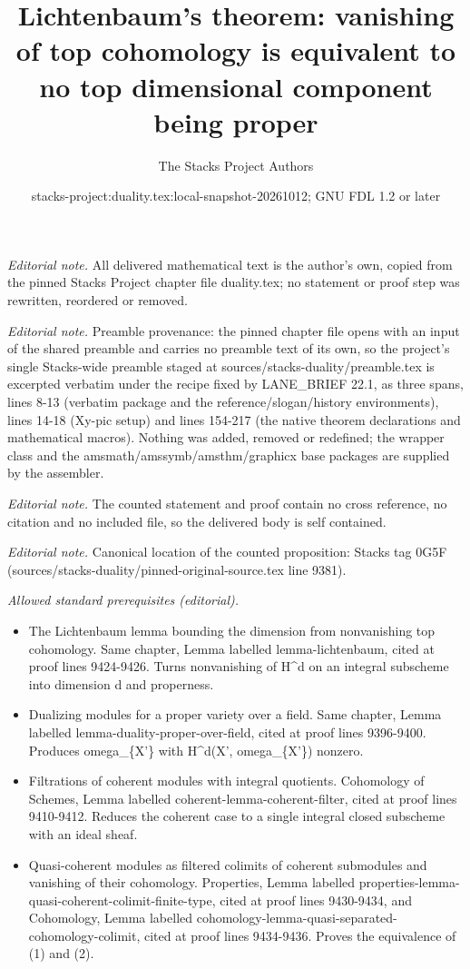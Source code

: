 \documentclass[10pt,a4paper]{amsart}
\title{Lichtenbaum's theorem: vanishing of top cohomology is equivalent to no top dimensional component being proper}
\author{The Stacks Project Authors}
\date{stacks-project:duality.tex:local-snapshot-20261012; GNU FDL 1.2 or later}
\theoremstyle{plain}
\theoremstyle{definition}
\theoremstyle{remark}
\numberwithin{equation}{subsection}
\begin{document}
\maketitle
\noindent\textit{Editorial note.} All delivered mathematical text is the author's own, copied from the pinned Stacks Project chapter file duality.tex; no statement or proof step was rewritten, reordered or removed.\par\medskip
\noindent\textit{Editorial note.} Preamble provenance: the pinned chapter file opens with an input of the shared preamble and carries no preamble text of its own, so the project's single Stacks-wide preamble staged at sources/stacks-duality/preamble.tex is excerpted verbatim under the recipe fixed by LANE\_BRIEF 22.1, as three spans, lines 8-13 (verbatim package and the reference/slogan/history environments), lines 14-18 (Xy-pic setup) and lines 154-217 (the native theorem declarations and mathematical macros). Nothing was added, removed or redefined; the wrapper class and the amsmath/amssymb/amsthm/graphicx base packages are supplied by the assembler.\par\medskip
\noindent\textit{Editorial note.} The counted statement and proof contain no cross reference, no citation and no included file, so the delivered body is self contained.\par\medskip
\noindent\textit{Editorial note.} Canonical location of the counted proposition: Stacks tag 0G5F (sources/stacks-duality/pinned-original-source.tex line 9381).\par\medskip
\noindent\textit{Allowed standard prerequisites (editorial).}\begin{itemize}
\item The Lichtenbaum lemma bounding the dimension from nonvanishing top cohomology. Same chapter, Lemma labelled lemma-lichtenbaum, cited at proof lines 9424-9426. Turns nonvanishing of H\textasciicircum{}d on an integral subscheme into dimension d and properness.
\item Dualizing modules for a proper variety over a field. Same chapter, Lemma labelled lemma-duality-proper-over-field, cited at proof lines 9396-9400. Produces omega\_\{X'\} with H\textasciicircum{}d(X', omega\_\{X'\}) nonzero.
\item Filtrations of coherent modules with integral quotients. Cohomology of Schemes, Lemma labelled coherent-lemma-coherent-filter, cited at proof lines 9410-9412. Reduces the coherent case to a single integral closed subscheme with an ideal sheaf.
\item Quasi-coherent modules as filtered colimits of coherent submodules and vanishing of their cohomology. Properties, Lemma labelled properties-lemma-quasi-coherent-colimit-finite-type, cited at proof lines 9430-9434, and Cohomology, Lemma labelled cohomology-lemma-quasi-separated-cohomology-colimit, cited at proof lines 9434-9436. Proves the equivalence of (1) and (2).
\end{itemize}\medskip
\end{document}
